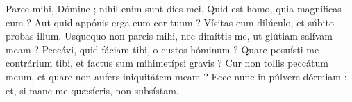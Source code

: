 \lettrine{P}{}arce mihi, Dómine ; nihil enim sunt dies mei.
Quid est homo, quia magníficas eum ? Aut quid appónis erga eum cor tuum ?
Vísitas eum dilúculo, et súbito probas illum.
Usquequo non parcis mihi, nec dimíttis me, ut glútiam salívam meam ?
Peccávi, quid fáciam tibi, o custos hóminum ? Quare posuísti me contrárium tibi, et factus sum mihimetípsi gravis ?
Cur non tollis peccátum meum, et quare non aufers iniquitátem meam ? Ecce nunc in púlvere dórmiam : et, si mane me quæsíeris, non subsístam.\\
